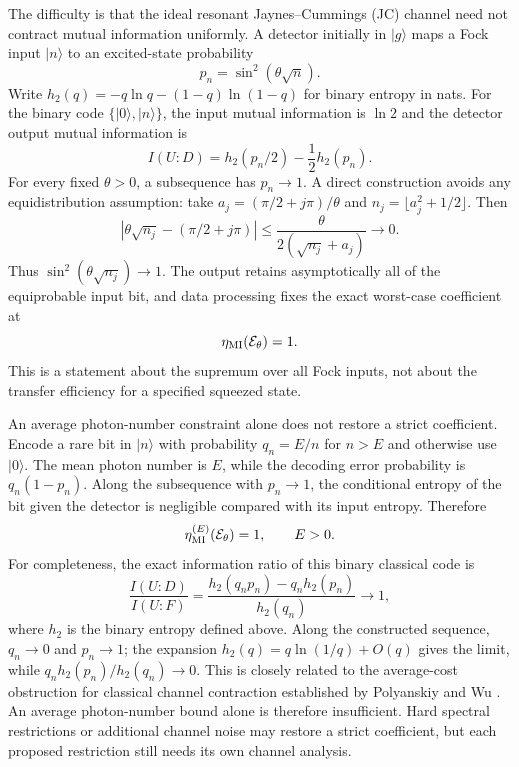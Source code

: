 \documentclass[pdflatex,sn-mathphys-num]{sn-jnl}
\begin{document}
The difficulty is that the ideal resonant Jaynes--Cummings (JC) channel need not contract mutual information uniformly. A detector initially in $|g\rangle$ maps a Fock input $|n\rangle$ to an excited-state probability
\begin{equation}
p_n=\sin^2(\theta\sqrt n).
\label{eq:jc-channel-fock-outputs}
\end{equation}
Write $h_2(q)=-q\ln q-(1-q)\ln(1-q)$ for binary entropy in nats. For the binary code $\{|0\rangle,|n\rangle\}$, the input mutual information is $\ln2$ and the detector output mutual information is
\begin{equation}
I(U:D)=h_2(p_n/2)-\frac12h_2(p_n).
\label{eq:jc-fock-code-mi}
\end{equation}
For every fixed $\theta>0$, a subsequence has $p_n\to1$. A direct construction avoids any equidistribution assumption: take $a_j=(\pi/2+j\pi)/\theta$ and $n_j=\lfloor a_j^2+1/2\rfloor$. Then
\begin{equation}
|\theta\sqrt{n_j}-(\pi/2+j\pi)|
\leq\frac{\theta}{2(\sqrt{n_j}+a_j)}\longrightarrow0.
\end{equation}
Thus $\sin^2(\theta\sqrt{n_j})\to1$. The output retains asymptotically all of the equiprobable input bit, and data processing fixes the exact worst-case coefficient at
\begin{equation}
\eta_{\rm MI}(\mathcal E_\theta)=1.
\label{eq:jc-uniform-coefficient-one}
\end{equation}
This is a statement about the supremum over all Fock inputs, not about the transfer efficiency for a specified squeezed state.

An average photon-number constraint alone does not restore a strict coefficient. Encode a rare bit in $|n\rangle$ with probability $q_n=E/n$ for $n>E$ and otherwise use $|0\rangle$. The mean photon number is $E$, while the decoding error probability is $q_n(1-p_n)$. Along the subsequence with $p_n\to1$, the conditional entropy of the bit given the detector is negligible compared with its input entropy. Therefore
\begin{equation}
\eta_{\rm MI}^{(E)}(\mathcal E_\theta)=1,\qquad E>0.
\label{eq:average-energy-mi-coefficient-one}
\end{equation}
For completeness, the exact information ratio of this binary classical code is
\begin{equation}
\frac{I(U:D)}{I(U:F)}
=\frac{h_2(q_np_n)-q_nh_2(p_n)}{h_2(q_n)}\longrightarrow1,
\label{eq:rare-code-information-ratio}
\end{equation}
where $h_2$ is the binary entropy defined above. Along the constructed sequence, $q_n\to0$ and $p_n\to1$; the expansion $h_2(q)=q\ln(1/q)+O(q)$ gives the limit, while $q_nh_2(p_n)/h_2(q_n)\to0$. This is closely related to the average-cost obstruction for classical channel contraction established by Polyanskiy and Wu \cite{PolyanskiyWu2016Dissipation}. An average photon-number bound alone is therefore insufficient. Hard spectral restrictions or additional channel noise may restore a strict coefficient, but each proposed restriction still needs its own channel analysis.
\end{document}
